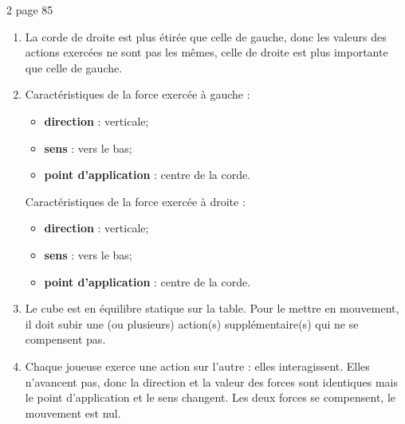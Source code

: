 \begin{frame}
\begin{myact}{2 page 85}
	\begin{enumerate}
		\item La corde de droite est plus étirée que celle de gauche, donc les valeurs des actions exercées ne sont pas les mêmes, celle de droite est plus importante que celle de gauche.
		
		\item Caractéristiques de la force exercée à gauche :\pause
		\begin{itemize}
			\item \textbf{direction} : verticale;
			\item \textbf{sens} : vers le bas;
			\item \textbf{point d'application} : centre de la corde.
		\end{itemize}
		
		Caractéristiques de la force exercée à droite :\pause
		\begin{itemize}
			\item \textbf{direction} : verticale;
			\item \textbf{sens} : vers le bas;
			\item \textbf{point d'application} : centre de la corde.
		\end{itemize}
		
		
	\end{enumerate}
\end{myact}
\end{frame}

\begin{frame}
\begin{enumerate}
\setcounter{enumi}{2}

\item Le cube est en équilibre statique sur la table. Pour le mettre en mouvement, il doit subir une (ou plusieurs) action(s) supplémentaire(s) qui ne se compensent pas.\pause

\item Chaque joueuse exerce une action sur l'autre : elles interagissent. Elles n'avancent pas, donc la direction et la valeur des forces sont identiques mais le point d'application et le sens changent. Les deux forces se compensent, le mouvement est nul.
\end{enumerate}
\end{frame}

